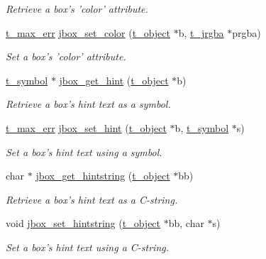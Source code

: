 \begin{DoxyCompactItemize}
\begin{DoxyCompactList}\small\item\em Retrieve a box's 'color' attribute. \item\end{DoxyCompactList}\item 
\hyperlink{group__datatypes_ga73edaae82b318855cc09fac994918165}{t\_\-max\_\-err} \hyperlink{group__jbox_ga211b979a249719dadd1168d72bc6df37}{jbox\_\-set\_\-color} (\hyperlink{structt__object}{t\_\-object} $\ast$b, \hyperlink{structt__jrgba}{t\_\-jrgba} $\ast$prgba)
\begin{DoxyCompactList}\small\item\em Set a box's 'color' attribute. \item\end{DoxyCompactList}\item 
\hyperlink{structt__symbol}{t\_\-symbol} $\ast$ \hyperlink{group__jbox_gad9614088919b6727e6ed7feebd83d065}{jbox\_\-get\_\-hint} (\hyperlink{structt__object}{t\_\-object} $\ast$b)
\begin{DoxyCompactList}\small\item\em Retrieve a box's hint text as a symbol. \item\end{DoxyCompactList}\item 
\hyperlink{group__datatypes_ga73edaae82b318855cc09fac994918165}{t\_\-max\_\-err} \hyperlink{group__jbox_ga7c7cc83f75351df0fa423c43592e589c}{jbox\_\-set\_\-hint} (\hyperlink{structt__object}{t\_\-object} $\ast$b, \hyperlink{structt__symbol}{t\_\-symbol} $\ast$s)
\begin{DoxyCompactList}\small\item\em Set a box's hint text using a symbol. \item\end{DoxyCompactList}\item 
char $\ast$ \hyperlink{group__jbox_ga80ff8da64e1e96abb21ae7e528c757c8}{jbox\_\-get\_\-hintstring} (\hyperlink{structt__object}{t\_\-object} $\ast$bb)
\begin{DoxyCompactList}\small\item\em Retrieve a box's hint text as a C-\/string. \item\end{DoxyCompactList}\item 
void \hyperlink{group__jbox_gad1651ffa12cf40c55de24e892be2fa42}{jbox\_\-set\_\-hintstring} (\hyperlink{structt__object}{t\_\-object} $\ast$bb, char $\ast$s)
\begin{DoxyCompactList}\small\item\em Set a box's hint text using a C-\/string. \item\end{DoxyCompactList}\item 

\end{DoxyCompactItemize}
